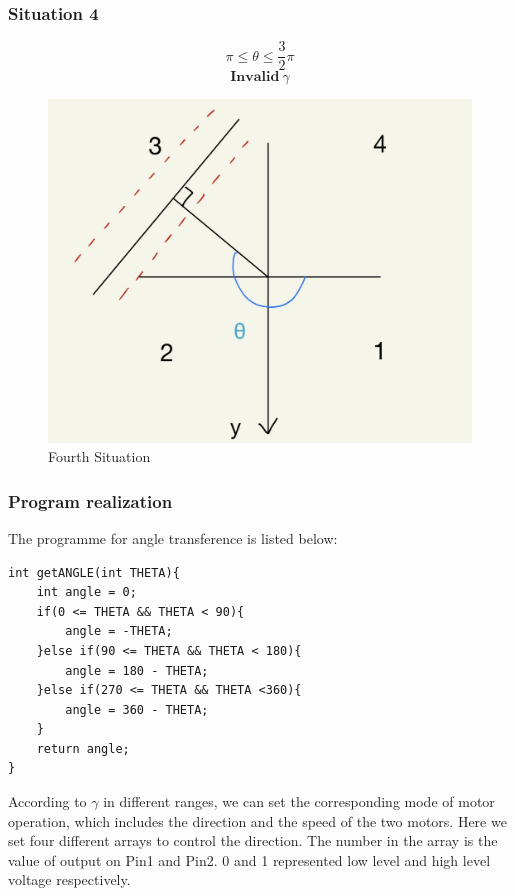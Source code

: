 \documentclass[12pt, a4paper, oneside]{report}
\begin{document}
\subsubsection{Situation 4}
\begin{tcolorbox}
$$\pi\leq\theta\leq\frac{3}{2}\pi$$
$$\textbf{Invalid}\  \gamma$$
\end{tcolorbox}
\begin{figure}[H]
    \centering
    \includegraphics[scale=0.2]{pic/angle/4.png}
    \caption{Fourth Situation}
    \label{fours}
\end{figure}
\subsubsection{Program realization}
The programme for angle transference is listed below:
\begin{lstlisting}
int getANGLE(int THETA){
    int angle = 0;
    if(0 <= THETA && THETA < 90){
        angle = -THETA;
    }else if(90 <= THETA && THETA < 180){
        angle = 180 - THETA;
    }else if(270 <= THETA && THETA <360){
        angle = 360 - THETA;
    }
    return angle;
}

\end{lstlisting}

According to $\gamma$ in different ranges, we can set the corresponding mode of motor operation, which includes the direction and the speed of the two motors. Here we set four different arrays to control the direction. The number in the array is the value of output on Pin1 and Pin2. 0 and 1 represented low level and high level voltage respectively. 
\end{document}
